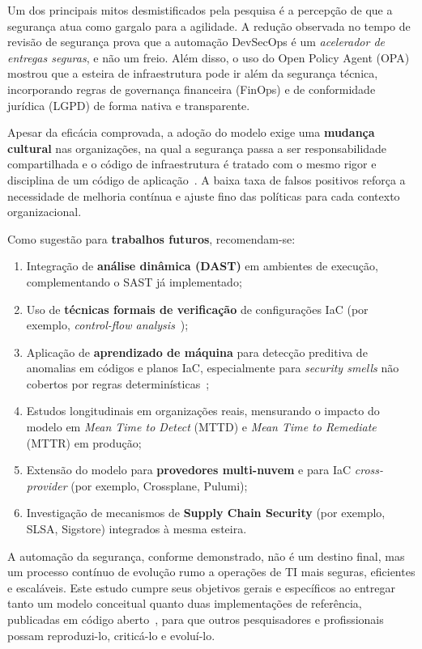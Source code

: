 Um dos principais mitos desmistificados pela pesquisa é a percepção de que a segurança atua como gargalo para a agilidade. A redução observada no tempo de revisão de segurança prova que a automação DevSecOps é um \textit{acelerador de entregas seguras}, e não um freio. Além disso, o uso do Open Policy Agent (OPA) mostrou que a esteira de infraestrutura pode ir além da segurança técnica, incorporando regras de governança financeira (FinOps) e de conformidade jurídica (LGPD) de forma nativa e transparente.

Apesar da eficácia comprovada, a adoção do modelo exige uma \textbf{mudança cultural} nas organizações, na qual a segurança passa a ser responsabilidade compartilhada e o código de infraestrutura é tratado com o mesmo rigor e disciplina de um código de aplicação~. A baixa taxa de falsos positivos reforça a necessidade de melhoria contínua e ajuste fino das políticas para cada contexto organizacional.

Como sugestão para \textbf{trabalhos futuros}, recomendam-se:

\begin{enumerate}
    \item Integração de \textbf{análise dinâmica (DAST)} em ambientes de execução, complementando o SAST já implementado;
    \item Uso de \textbf{técnicas formais de verificação} de configurações IaC (por exemplo, \textit{control-flow analysis}~);
    \item Aplicação de \textbf{aprendizado de máquina} para detecção preditiva de anomalias em códigos e planos IaC, especialmente para \textit{security smells} não cobertos por regras determinísticas~;
    \item Estudos longitudinais em organizações reais, mensurando o impacto do modelo em \textit{Mean Time to Detect} (MTTD) e \textit{Mean Time to Remediate} (MTTR) em produção;
    \item Extensão do modelo para \textbf{provedores multi-nuvem} e para IaC \textit{cross-provider} (por exemplo, Crossplane, Pulumi);
    \item Investigação de mecanismos de \textbf{Supply Chain Security} (por exemplo, SLSA, Sigstore) integrados à mesma esteira.
\end{enumerate}

A automação da segurança, conforme demonstrado, não é um destino final, mas um processo contínuo de evolução rumo a operações de TI mais seguras, eficientes e escaláveis. Este estudo cumpre seus objetivos gerais e específicos ao entregar tanto um modelo conceitual quanto duas implementações de referência, publicadas em código aberto~, para que outros pesquisadores e profissionais possam reproduzi-lo, criticá-lo e evoluí-lo.
